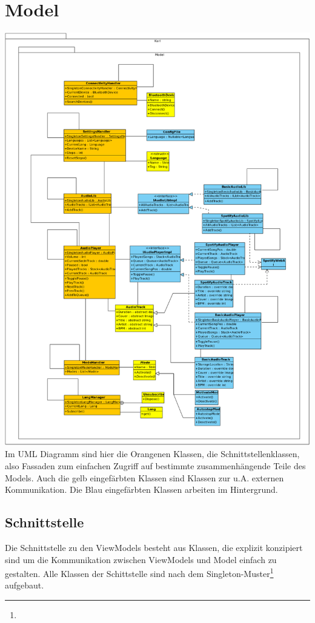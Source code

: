 \documentclass[../entwurf.tex]{subfiles}
\begin{document}
	\section{Model}
		\includegraphics[width=\textwidth,height=\textheight,keepaspectratio]{../graphics/uml_diagramme/Model.png}
		\newpage
		Im UML Diagramm sind hier die Orangenen Klassen, die Schnittstellenklassen, also Fassaden zum einfachen 
		Zugriff auf bestimmte zusammenhängende Teile des Models. Auch die gelb eingefärbten Klassen sind Klassen zur 
		u.A. externen Kommunikation. Die Blau eingefärbten Klassen arbeiten im Hintergrund.
		\subsection{Schnittstelle}
			Die Schnittstelle zu den ViewModels besteht aus Klassen, die explizit konzipiert sind um die Kommunikation zwischen ViewModels und Model
			einfach zu gestalten. Alle Klassen der Schittstelle sind nach dem 
			Singleton-Muster\footnote{} aufgebaut.
\end{document}
